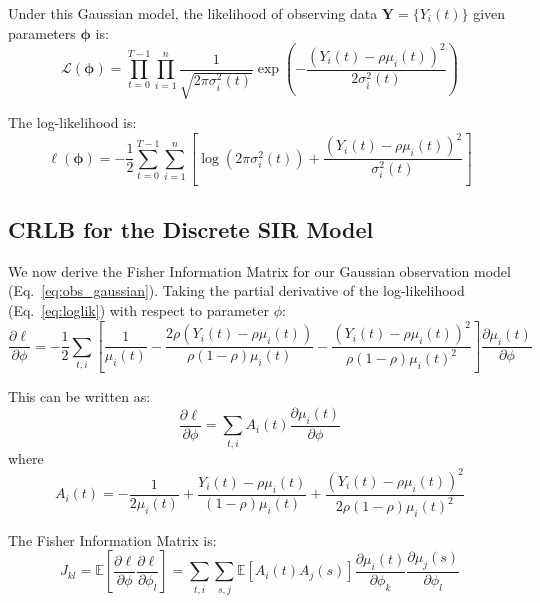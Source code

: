 Under this Gaussian model, the likelihood of observing data
$\mathbf{Y} = \{Y_i(t)\}$ given parameters $\boldsymbol{\phi}$ is:
\begin{equation}\label{eq:likelihood}
\mathcal{L}(\boldsymbol{\phi}) = \prod_{t=0}^{T-1} \prod_{i=1}^{n}
\frac{1}{\sqrt{2\pi\sigma_i^2(t)}}
\exp\left(-\frac{(Y_i(t) - \rho\mu_i(t))^2}{2\sigma_i^2(t)}\right)
\end{equation}

The log-likelihood is:
\begin{equation}\label{eq:loglik}
\ell(\boldsymbol{\phi}) = -\frac{1}{2}\sum_{t=0}^{T-1}\sum_{i=1}^{n}
\left[\log(2\pi \sigma_i^2(t)) +
\frac{(Y_i(t) - \rho\mu_i(t))^2}{\sigma_i^2(t)}\right]
\end{equation}



\subsection*{CRLB for the Discrete SIR Model}

We now derive the Fisher Information Matrix for our Gaussian observation
model (Eq.~\ref{eq:obs_gaussian}). Taking the partial derivative of the
log-likelihood (Eq.~\ref{eq:loglik}) with respect to parameter $\phi$:
\begin{equation*}
\frac{\partial \ell}{\partial \phi} = -\frac{1}{2}\sum_{t,i} \left[
\frac{1}{\mu_i(t)} - \frac{2\rho(Y_i(t) - \rho\mu_i(t))}{\rho(1-\rho)\mu_i(t)}
- \frac{(Y_i(t) - \rho\mu_i(t))^2}{\rho(1-\rho)\mu_i(t)^2}\right]
\frac{\partial \mu_i(t)}{\partial \phi}
\end{equation*}

This can be written as:
\begin{equation}\label{eq:score}
\frac{\partial \ell}{\partial \phi} = \sum_{t,i} A_i(t)
\frac{\partial \mu_i(t)}{\partial \phi}
\end{equation}
where
\begin{equation*}
A_i(t) = -\frac{1}{2\mu_i(t)} + \frac{Y_i(t) - \rho\mu_i(t)}{(1-\rho)\mu_i(t)}
+ \frac{(Y_i(t) - \rho\mu_i(t))^2}{2\rho(1-\rho)\mu_i(t)^2}
\end{equation*}

The Fisher Information Matrix is:
\begin{equation*}
J_{kl} = \mathbb{E}\left[\frac{\partial \ell}{\partial \phi}
\frac{\partial \ell}{\partial \phi_l}\right] = \sum_{t,i}\sum_{s,j}
\mathbb{E}[A_i(t) A_j(s)] \frac{\partial \mu_i(t)}{\partial \phi_k}
\frac{\partial \mu_j(s)}{\partial \phi_l}
\end{equation*}

